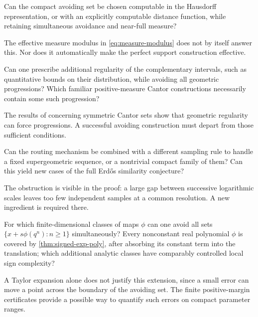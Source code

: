 \begin{question}
Can the compact avoiding set be chosen computable in the Hausdorff
representation, or with an explicitly computable distance function,
while retaining simultaneous avoidance and near-full measure?
\end{question}
The effective measure modulus in \eqref{eq:measure-modulus} does not
by itself answer this. Nor does it automatically make the perfect
support construction effective.

\begin{question}
Can one prescribe additional regularity of the complementary intervals,
such as quantitative bounds on their distribution, while avoiding all
geometric progressions? Which familiar positive-measure Cantor
constructions necessarily contain some such progression?
\end{question}
The results of \cite{BGKMW} concerning symmetric Cantor sets show
that geometric regularity can force progressions. A successful avoiding
construction must depart from those sufficient conditions.

\begin{question}
Can the routing mechanism be combined with a different sampling rule
to handle a fixed supergeometric sequence, or a nontrivial compact
family of them? Can this yield new cases of the full Erd\H{o}s
similarity conjecture?
\end{question}
The obstruction is visible in the proof: a large gap between successive
logarithmic scales leaves too few independent samples at a common
resolution. A new ingredient is required there.

\begin{question}
For which finite-dimensional classes of maps $\phi$ can one avoid all
sets $\{x+s\phi(q^n):n\ge1\}$ simultaneously? Every nonconstant real
polynomial $\phi$ is covered by \cref{thm:signed-exp-poly}, after
absorbing its constant term into the translation;
which additional analytic classes have comparably controlled local
sign complexity?
\end{question}
A Taylor expansion alone does not justify this extension, since a
small error can move a point across the boundary of the avoiding set.
The finite positive-margin certificates provide a possible way to
quantify such errors on compact parameter ranges.
